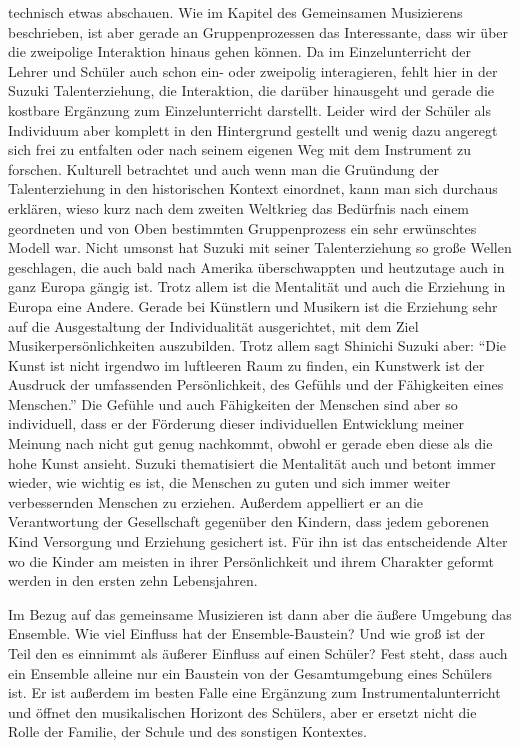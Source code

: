 technisch etwas abschauen. Wie im Kapitel des Gemeinsamen Musizierens
beschrieben, ist aber gerade an Gruppenprozessen das Interessante, dass wir über
die zweipolige Interaktion hinaus gehen können. Da im Einzelunterricht der
Lehrer und Schüler auch schon ein- oder zweipolig interagieren, fehlt hier in
der Suzuki Talenterziehung, die Interaktion, die darüber hinausgeht und gerade
die kostbare Ergänzung zum Einzelunterricht darstellt. Leider wird der Schüler
als Individuum aber komplett in den Hintergrund gestellt und wenig dazu angeregt
sich frei zu entfalten oder nach seinem eigenen Weg mit dem Instrument zu
forschen. Kulturell betrachtet und auch wenn man die Gruündung der
Talenterziehung in den historischen Kontext einordnet, kann man sich durchaus
erklären, wieso kurz nach dem zweiten Weltkrieg das Bedürfnis nach einem
geordneten und von Oben bestimmten Gruppenprozess ein sehr erwünschtes Modell
war. Nicht umsonst hat Suzuki mit seiner Talenterziehung so große Wellen
geschlagen, die auch bald nach Amerika überschwappten und heutzutage auch in
ganz 
Europa gängig ist. Trotz allem ist die Mentalität und auch die Erziehung in
Europa eine Andere. Gerade bei Künstlern und Musikern ist die Erziehung sehr auf
die Ausgestaltung der Individualität ausgerichtet, mit dem Ziel
Musikerpersönlichkeiten auszubilden. Trotz allem sagt Shinichi Suzuki aber: \enquote{Die
Kunst ist nicht irgendwo im luftleeren Raum zu finden, ein Kunstwerk ist der
Ausdruck der umfassenden Persönlichkeit, des Gefühls und der Fähigkeiten eines
Menschen.} \autocite[103]{suzuki:erziehung_ist_liebe} Die Gefühle und auch
Fähigkeiten der Menschen sind aber so individuell, dass er der Förderung dieser
individuellen Entwicklung meiner Meinung nach nicht gut genug nachkommt, obwohl
er gerade eben diese als die hohe Kunst ansieht. Suzuki thematisiert die
Mentalität auch und betont immer wieder, wie wichtig es ist,
die Menschen zu guten und sich immer weiter verbessernden Menschen zu erziehen.
Außerdem appelliert er an die Verantwortung der Gesellschaft gegenüber den
Kindern, dass jedem geborenen Kind Versorgung und Erziehung gesichert ist.
\autocite[130]{suzuki:erziehung_ist_liebe} Für ihn ist das entscheidende
Alter wo die Kinder am meisten in ihrer Persönlichkeit und ihrem Charakter
geformt werden in den ersten zehn Lebensjahren. 


Im Bezug auf das gemeinsame Musizieren ist dann aber die äußere Umgebung das
Ensemble. Wie viel Einfluss hat der Ensemble-Baustein? Und wie groß ist der
Teil den es einnimmt als äußerer Einfluss auf einen Schüler? Fest steht, dass
auch ein Ensemble alleine nur ein Baustein von der Gesamtumgebung eines Schülers
ist. Er ist außerdem im besten Falle eine Ergänzung zum Instrumentalunterricht
und öffnet den musikalischen Horizont des Schülers, aber er ersetzt nicht die
Rolle der Familie, der Schule und des sonstigen Kontextes. 






